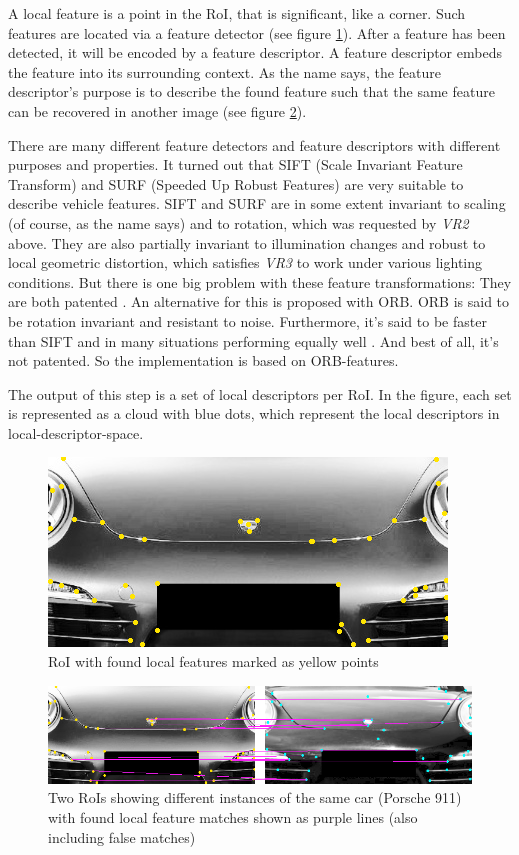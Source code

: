 A local feature is a point in the RoI, that is significant, like a corner. Such features are located via a feature detector (see figure \ref{fig:localFeaturesExample}). After a feature has been detected, it will be encoded by a feature descriptor. A feature descriptor embeds the feature into its surrounding context. As the name says, the feature descriptor's purpose is to describe the found feature such that the same feature can be recovered in another image (see figure \ref{fig:localFeaturesMatchingExample}).

There are many different feature detectors and feature descriptors with different purposes and properties. It turned out that SIFT (Scale Invariant Feature Transform) \citep{lowe1999object} and SURF (Speeded Up Robust Features) \citep{bay2008speeded} are very suitable to describe vehicle features. SIFT and SURF are in some extent invariant to scaling (of course, as the name says) and to rotation, which was requested by \emph{VR2} above. They are also partially invariant to illumination changes and robust to local geometric distortion, which satisfies \emph{VR3} to work under various lighting conditions. But there is one big problem with these feature transformations: They are both patented \citep{siftPatent2004} \citep{surfPatent2009}. An alternative for this is proposed with ORB. ORB is said to be rotation invariant and resistant to noise. Furthermore, it's said to be faster than SIFT and in many situations performing equally well \citep{rublee2011orb}. And best of all, it's not patented. So the implementation is based on ORB-features.

The output of this step is a set of local descriptors per RoI. In the figure, each set is represented as a cloud with blue dots, which represent the local descriptors in local-descriptor-space.

\begin{figure}[btph]
  \centering
        \includegraphics[width=.35\linewidth]{gfx/local_features_porsche}
        \caption{RoI with found local features marked as yellow points}
        \label{fig:localFeaturesExample}
\end{figure}
\begin{figure}[btph]
  \centering
        \includegraphics[width=.65\linewidth]{gfx/local_features_porsche_matching}
        \caption{Two RoIs showing different instances of the same car (Porsche 911) with found local feature matches shown as purple lines (also including false matches)}
        \label{fig:localFeaturesMatchingExample}
\end{figure}

